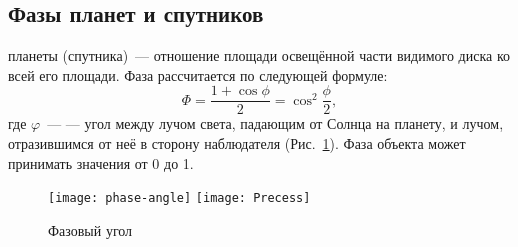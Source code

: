 \subsection{Фазы планет и спутников}

 планеты (спутника)~--- отношение площади освещённой  части видимого диска ко всей его площади.
Фаза рассчитается по следующей формуле:\begin{equation}
\Phi = \frac{1 + \cos \phi}{2} = \cos^2 \frac{\phi}{2},
\end{equation}
где $\varphi$~---  --- угол между лучом света, падающим от Солнца на планету, и лучом, отразившимся от неё в сторону наблюдателя (Рис.~\ref{fig:phase-angel-scheme}). Фаза объекта может принимать значения от 0 до 1.
\begin{figure}[h!]
\centering
\texttt{[image: phase-angle]}
\texttt{[image: Precess]}
\caption{Фазовый угол}
\label{fig:phase-angel-scheme}
\end{figure}